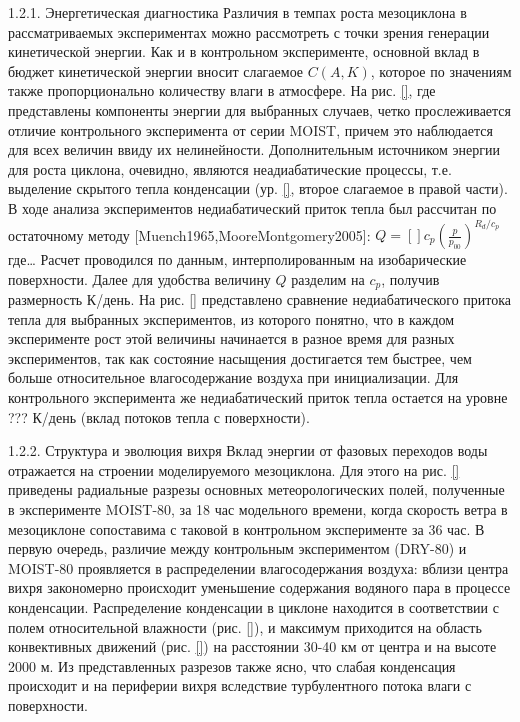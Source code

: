 1.2.1.	Энергетическая диагностика
Различия в темпах роста мезоциклона в рассматриваемых экспериментах можно рассмотреть с точки зрения генерации кинетической энергии. Как и в контрольном эксперименте, основной вклад в бюджет кинетической энергии вносит слагаемое $C(A,K)$, которое по значениям также пропорционально количеству влаги в атмосфере. На рис. \ref{}, где представлены компоненты энергии для выбранных случаев, четко прослеживается отличие контрольного эксперимента от серии MOIST, причем это наблюдается для всех величин ввиду их нелинейности.
Дополнительным источником энергии для роста циклона, очевидно, являются неадиабатические процессы, т.е. выделение скрытого тепла конденсации (ур. \ref{}, второе слагаемое в правой части). В ходе анализа экспериментов недиабатический приток тепла был рассчитан по остаточному методу [Muench1965,MooreMontgomery2005]:
$Q=\left[\right]c_p\left(\frac{p}{p_{00}}\right)^{R_d/c_p}$
где…
Расчет проводился по данным, интерполированным на изобарические поверхности. Далее для удобства величину $Q$ разделим на $c_p$, получив размерность К/день. На рис. \ref{} представлено сравнение недиабатического притока тепла для выбранных экспериментов, из которого понятно, что в каждом эксперименте рост этой величины начинается в разное время для разных экспериментов, так как состояние насыщения достигается тем быстрее, чем больше относительное влагосодержание воздуха при инициализации. Для контрольного эксперимента же недиабатический приток тепла остается на уровне ??? К/день (вклад потоков тепла с поверхности).

1.2.2.	Структура и эволюция вихря
Вклад энергии от фазовых переходов воды отражается на строении моделируемого мезоциклона. Для этого на рис. \ref{} приведены радиальные разрезы основных метеорологических полей, полученные в эксперименте MOIST-80, за 18 час модельного времени, когда скорость ветра в мезоциклоне сопоставима с таковой  в контрольном эксперименте за 36 час.
В первую очередь, различие между контрольным экспериментом (DRY-80) и MOIST-80 проявляется в распределении влагосодержания воздуха: вблизи центра вихря закономерно происходит уменьшение содержания водяного пара в процессе конденсации. Распределение конденсации в циклоне находится в соответствии с полем относительной влажности (рис. \ref{}), и максимум приходится на область конвективных движений (рис. \ref{}) на расстоянии 30-40 км от центра и на высоте 2000 м. Из представленных разрезов также ясно, что слабая конденсация происходит и на периферии вихря вследствие турбулентного потока влаги с поверхности.



